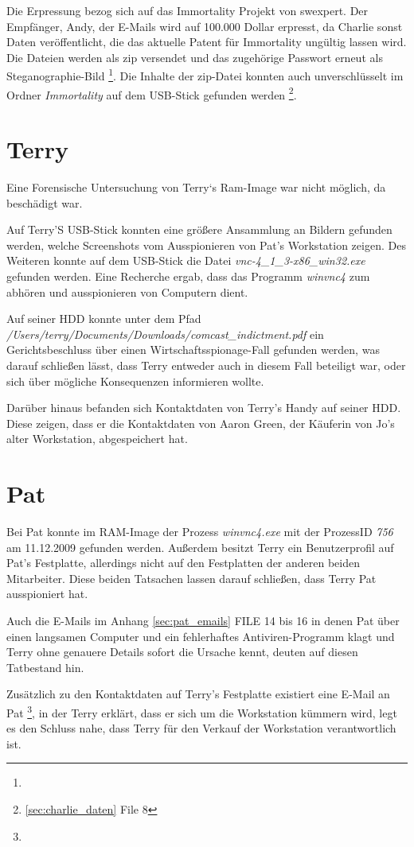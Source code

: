 Die Erpressung bezog sich auf das Immortality Projekt von swexpert. Der Empfänger, Andy, der E-Mails wird auf
100.000 Dollar erpresst, da Charlie sonst Daten veröffentlicht, die das aktuelle Patent für Immortality
ungültig lassen wird. Die Dateien werden als zip versendet und das zugehörige Passwort erneut als
Steganographie-Bild \footnote{}. Die Inhalte der zip-Datei konnten auch
unverschlüsselt im Ordner \textit{Immortality} auf dem USB-Stick gefunden werden \footnote{\ref{sec:charlie_daten} File 8}.

\section{Terry}
\label{sec:terry}
Eine Forensische Untersuchung von Terry`s Ram-Image war nicht möglich, da beschädigt war.

Auf Terry'S USB-Stick konnten eine größere Ansammlung an Bildern gefunden werden, welche Screenshots vom Ausspionieren von Pat's Workstation zeigen. Des Weiteren konnte auf dem USB-Stick die Datei \textit{vnc-4_1_3-x86_win32.exe} gefunden werden. Eine Recherche ergab, dass das Programm \textit{winvnc4} zum abhören und ausspionieren von Computern dient.

Auf seiner HDD konnte unter dem Pfad \textit{/Users/terry/Documents/Downloads/comcast_indictment.pdf} ein Gerichtsbeschluss über einen Wirtschaftsspionage-Fall gefunden werden, was darauf schließen lässt, dass Terry entweder auch in diesem Fall beteiligt war, oder sich über mögliche Konsequenzen informieren wollte.\newline

Darüber hinaus befanden sich Kontaktdaten von Terry's Handy auf seiner HDD. Diese zeigen, dass er die Kontaktdaten von Aaron Green, der Käuferin von Jo's alter Workstation, abgespeichert hat.

\section{Pat}
\label{sec:pat}
Bei Pat konnte im RAM-Image der Prozess \textit{winvnc4.exe} mit der ProzessID \textit{756} am 11.12.2009 gefunden werden. Außerdem besitzt Terry ein Benutzerprofil auf Pat's Festplatte, allerdings nicht auf den Festplatten der anderen beiden Mitarbeiter. Diese beiden Tatsachen lassen darauf schließen, dass Terry Pat ausspioniert hat.

Auch die E-Mails im Anhang \ref{sec:pat_emails} FILE 14 bis 16 in denen Pat über einen langsamen Computer und ein fehlerhaftes Antiviren-Programm klagt und Terry ohne genauere Details sofort die Ursache kennt, deuten auf diesen Tatbestand hin.\newline

Zusätzlich zu den Kontaktdaten auf Terry's Festplatte existiert eine E-Mail an Pat
\footnote{}, in der Terry erklärt, dass er sich um die Workstation kümmern wird, legt es den Schluss nahe, dass Terry für den Verkauf der Workstation verantwortlich ist.

